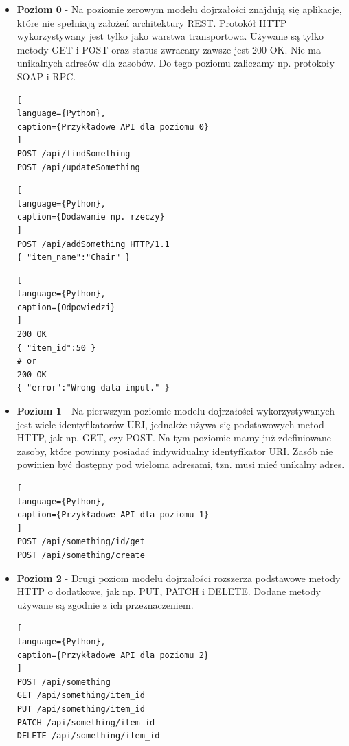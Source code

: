 \documentclass[oneside,polski,logo,indent]{amuthesis}
\begin{document}
\begin{itemize}
\item \textbf{Poziom 0} - Na poziomie zerowym modelu dojrzałości znajdują się aplikacje, które nie spełniają założeń architektury REST. Protokół HTTP wykorzystywany jest tylko jako warstwa transportowa. Używane są tylko metody GET i POST oraz status zwracany zawsze jest 200 OK. Nie ma unikalnych adresów dla zasobów. Do tego poziomu zaliczamy np. protokoły SOAP i RPC.

\begin{lstlisting}[
language={Python},
caption={Przykładowe API dla poziomu 0}
]
POST /api/findSomething
POST /api/updateSomething
\end{lstlisting}

\begin{lstlisting}[
language={Python},
caption={Dodawanie np. rzeczy}
]
POST /api/addSomething HTTP/1.1
{ "item_name":"Chair" }
\end{lstlisting}

\newpage 
\begin{lstlisting}[
language={Python},
caption={Odpowiedzi}
]
200 OK
{ "item_id":50 }
# or
200 OK
{ "error":"Wrong data input." }
\end{lstlisting}

\item \textbf{Poziom 1} - Na pierwszym poziomie modelu dojrzałości wykorzystywanych jest wiele identyfikatorów URI, jednakże używa się podstawowych metod HTTP, jak np. GET, czy POST. Na tym poziomie mamy już zdefiniowane zasoby, które powinny posiadać indywidualny identyfikator URI. Zasób nie powinien być dostępny pod wieloma adresami, tzn. musi mieć unikalny adres.

\begin{lstlisting}[
language={Python},
caption={Przykładowe API dla poziomu 1}
]
POST /api/something/id/get
POST /api/something/create
\end{lstlisting}

\item \textbf{Poziom 2} - Drugi poziom modelu dojrzałości rozszerza podstawowe metody HTTP o dodatkowe, jak np. PUT, PATCH i DELETE. Dodane metody używane są zgodnie z ich przeznaczeniem.

\begin{lstlisting}[
language={Python},
caption={Przykładowe API dla poziomu 2}
]
POST /api/something
GET /api/something/item_id
PUT /api/something/item_id
PATCH /api/something/item_id
DELETE /api/something/item_id
\end{lstlisting}


\end{itemize}
\end{document}
